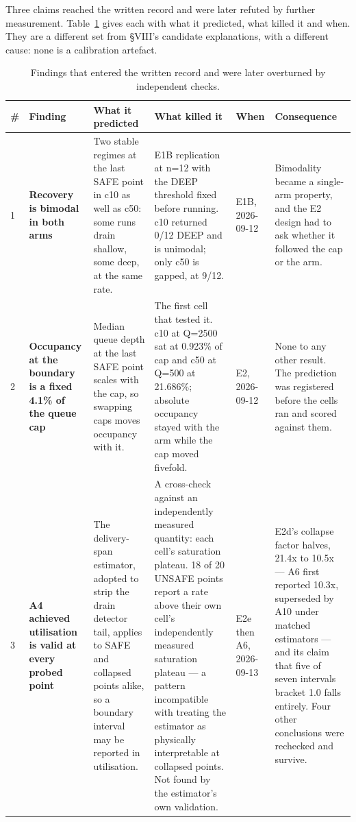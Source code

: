 \documentclass{ieeeaccess}
\begin{document}
Three claims reached the written record and were later refuted by further measurement. Table~\ref{tab:false-findings} gives each with what it predicted, what killed it and when. They are a different set from \S{}VIII's candidate explanations, with a different cause: none is a calibration artefact.

\begin{table}[!t]
\caption[Findings that entered the written record and were later overturned by independent checks.]{Findings that entered the written record and were later overturned by independent checks.}
\label{tab:false-findings}
\centering
\footnotesize
\begin{tabularx}{\textwidth}{l>{\raggedright\arraybackslash}X>{\raggedright\arraybackslash}X>{\raggedright\arraybackslash}Xl>{\raggedright\arraybackslash}X}
\hline
{\bfseries \#} & {\bfseries Finding} & {\bfseries What it predicted} & {\bfseries What killed it} & {\bfseries When} & {\bfseries Consequence} \\ \hline
1 & {\bfseries Recovery is bimodal in both arms} & Two stable regimes at the last SAFE point in c10 as well as c50: some runs drain shallow, some deep, at the same rate. & E1B replication at n=12 with the DEEP threshold fixed before running. c10 returned 0/12 DEEP and is unimodal; only c50 is gapped, at 9/12. & E1B, 2026-09-12 & Bimodality became a single-arm property, and the E2 design had to ask whether it followed the cap or the arm. \\
2 & {\bfseries Occupancy at the boundary is a fixed 4.1\% of the queue cap} & Median queue depth at the last SAFE point scales with the cap, so swapping caps moves occupancy with it. & The first cell that tested it. c10 at Q=2500 sat at 0.923\% of cap and c50 at Q=500 at 21.686\%; absolute occupancy stayed with the arm while the cap moved fivefold. & E2, 2026-09-12 & None to any other result. The prediction was registered before the cells ran and scored against them. \\
3 & {\bfseries A4 achieved utilisation is valid at every probed point} & The delivery-span estimator, adopted to strip the drain detector tail, applies to SAFE and collapsed points alike, so a boundary interval may be reported in utilisation. & A cross-check against an independently measured quantity: each cell's saturation plateau. 18 of 20 UNSAFE points report a rate above their own cell's independently measured saturation plateau --- a pattern incompatible with treating the estimator as physically interpretable at collapsed points. Not found by the estimator's own validation. & E2e then A6, 2026-09-13 & E2d's collapse factor halves, 21.4x to 10.5x --- A6 first reported 10.3x, superseded by A10 under matched estimators --- and its claim that five of seven intervals bracket 1.0 falls entirely. Four other conclusions were rechecked and survive. \\
\hline
\end{tabularx}
\end{table}
\end{document}
